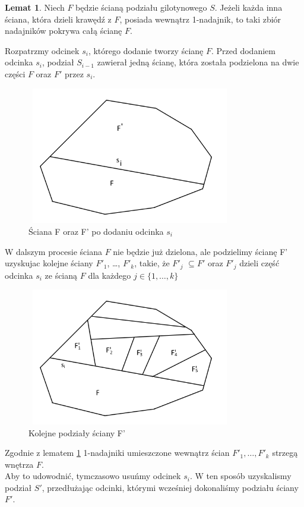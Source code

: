 \documentclass[brudnopis]{xmgr}
\theoremstyle{definition}
\newtheorem{Lemat}{Lemat}
\begin{document}
\begin{Lemat}\label{sasiednie sciany strzega F} \cite{knadajniki}
  Niech $F$ będzie ścianą podziału gilotynowego $S$. Jeżeli każda inna ściana, która dzieli krawędź z $F$, posiada wewnątrz 1-nadajnik, to taki zbiór nadajników pokrywa całą ścianę $F$.
\end{Lemat}
\indent Rozpatrzmy odcinek $s_i$, którego dodanie tworzy ścianę $F$. Przed dodaniem odcinka $s_i$, podział $S_{i-1}$ zawierał jedną ścianę, która została podzielona na dwie części $F$ oraz $F'$ przez $s_i$. 
\begin{figure}[ht!]
   \centering
   \label{podzial F przez s_i}
   \includegraphics[width=9cm,height=6cm]{rysunki/podzial_F.png}
   \caption{Ściana F oraz F' po dodaniu odcinka $s_i$}
\end{figure} 


W dalszym procesie ściana $F$ nie będzie już dzielona, ale podzielimy ścianę F' uzyskujac kolejne ściany $F'_1$, \ldots, $F'_k$, takie, że $F'_j$ $\subseteq F'$ oraz $F'_j$ dzieli część odcinka $s_i$ ze ścianą $F$ dla każdego $j \in \{1,\ldots,k\}$

\begin{figure}[ht!]
  \centering
  \label{podzial F' na kolejne ściany}
  \includegraphics[width=9cm,height=6cm]{rysunki/podzial_F'.png}
  \caption{Kolejne podziały ściany F'}
\end{figure} 
Zgodnie z lematem \ref{sasiednie sciany strzega F} 1-nadajniki umieszczone wewnątrz ścian $F'_1, \ldots, F'_k$ strzegą wnętrza $F$. 
\\Aby to udowodnić, tymczasowo usuńmy odcinek $s_i$. W ten sposób uzyskalismy podział $S'$, przedłużając odcinki, którymi wcześniej dokonaliśmy podziału ściany $F'$.
\end{document}
